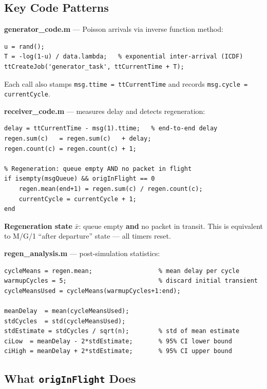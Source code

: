 \documentclass[10pt,a4paper]{article}
\begin{document}
\subsection*{Key Code Patterns}

\begin{keybox}
\textbf{generator\_code.m} --- Poisson arrivals via inverse function method:
\begin{verbatim}
u = rand();
T = -log(1-u) / data.lambda;   % exponential inter-arrival (ICDF)
ttCreateJob('generator_task', ttCurrentTime + T);
\end{verbatim}
Each call also stamps \texttt{msg.ttime = ttCurrentTime} and records \texttt{msg.cycle = currentCycle}.
\end{keybox}

\begin{keybox}
\textbf{receiver\_code.m} --- measures delay and detects regeneration:
\begin{verbatim}
delay = ttCurrentTime - msg(1).ttime;   % end-to-end delay
regen.sum(c)   = regen.sum(c)   + delay;
regen.count(c) = regen.count(c) + 1;

% Regeneration: queue empty AND no packet in flight
if isempty(msgQueue) && origInFlight == 0
    regen.mean(end+1) = regen.sum(c) / regen.count(c);
    currentCycle = currentCycle + 1;
end
\end{verbatim}
\textbf{Regeneration state} $\bar{x}$: queue empty \textbf{and} no packet in transit.
This is equivalent to M/G/1 ``after departure'' state --- all timers reset.
\end{keybox}

\begin{keybox}
\textbf{regen\_analysis.m} --- post-simulation statistics:
\begin{verbatim}
cycleMeans = regen.mean;                  % mean delay per cycle
warmupCycles = 5;                         % discard initial transient
cycleMeansUsed = cycleMeans(warmupCycles+1:end);

meanDelay  = mean(cycleMeansUsed);
stdCycles  = std(cycleMeansUsed);
stdEstimate = stdCycles / sqrt(n);        % std of mean estimate
ciLow  = meanDelay - 2*stdEstimate;       % 95% CI lower bound
ciHigh = meanDelay + 2*stdEstimate;       % 95% CI upper bound
\end{verbatim}
\end{keybox}

\subsection*{What \texttt{origInFlight} Does}
\end{document}
